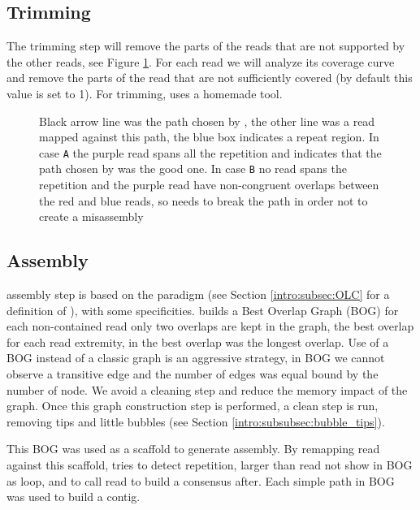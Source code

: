 \documentclass[main]{subfiles}
\begin{document}
\subsection{Trimming}

The trimming step will remove the parts of the reads that are not supported by the other reads, see Figure \ref{sota:fig:canu:trimming}. For each read we will analyze its coverage curve and remove the parts of the read that are not sufficiently covered (by default this value is set to 1). For trimming, \canu uses a homemade tool. 


\begin{figure}[ht]
    \centering
    
    \caption{Black arrow line was the path chosen by \canu, the other line was a read mapped against this path, the blue box indicates a repeat region. In case \texttt{A} the purple read spans all the repetition and indicates that the path chosen by \canu was the good one. In case \texttt{B} no read spans the repetition and the purple read have non-congruent overlaps between the red and blue reads, so \canu needs to break the path in order not to create a misassembly}
    \label{sota:fig:canu:trimming}
\end{figure}

\subsection{Assembly}

\canu assembly step is based on the \OLC paradigm (see Section \ref{intro:subsec:OLC} for a definition of \OLC), with some specificities. \canu builds a Best Overlap Graph (BOG) for each non-contained read only two overlaps are kept in the graph, the best overlap for each read extremity, in \canu the best overlap was the longest overlap. Use of a BOG instead of a classic \OLC graph is an aggressive strategy, in BOG we cannot observe a transitive edge and the number of edges was equal bound by the number of node. We avoid a cleaning step and reduce the memory impact of the graph. Once this graph construction step is performed, a clean step is run, removing tips and little bubbles (see Section \ref{intro:subsubsec:bubble_tips}).

This BOG was used as a scaffold to generate assembly. By remapping read against this scaffold, \canu tries to detect repetition, larger than read not show in BOG as loop, and to call read to build a consensus after. Each simple path in BOG was used to build a contig. 
\end{document}
